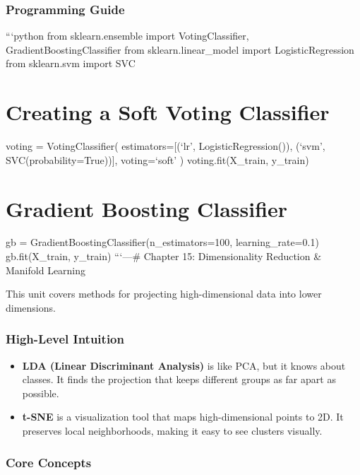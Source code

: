 \subsubsection{Programming Guide}\label{programming-guide-13}

```python from sklearn.ensemble import VotingClassifier,
GradientBoostingClassifier from sklearn.linear\_model import
LogisticRegression from sklearn.svm import SVC

\section{Creating a Soft Voting
Classifier}\label{creating-a-soft-voting-classifier}

voting = VotingClassifier( estimators={[}(`lr', LogisticRegression()),
(`svm', SVC(probability=True)){]}, voting=`soft' ) voting.fit(X\_train,
y\_train)

\section{Gradient Boosting
Classifier}\label{gradient-boosting-classifier}

gb = GradientBoostingClassifier(n\_estimators=100, learning\_rate=0.1)
gb.fit(X\_train, y\_train) ```\n\n---\n\n\# Chapter 15: Dimensionality
Reduction \& Manifold Learning

This unit covers methods for projecting high-dimensional data into lower
dimensions.

\subsubsection{High-Level Intuition}\label{high-level-intuition-14}

\begin{itemize}
\tightlist
\item
  \textbf{LDA (Linear Discriminant Analysis)} is like PCA, but it knows
  about classes. It finds the projection that keeps different groups as
  far apart as possible.
\item
  \textbf{t-SNE} is a visualization tool that maps high-dimensional
  points to 2D. It preserves local neighborhoods, making it easy to see
  clusters visually.
\end{itemize}

\subsubsection{Core Concepts}\label{core-concepts-8}

